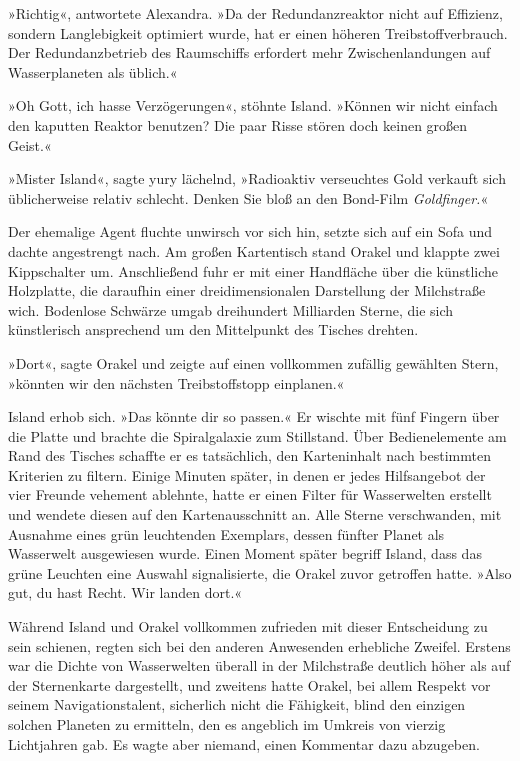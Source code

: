 »Richtig«, antwortete Alexandra. »Da der Redundanzreaktor nicht auf Effizienz, sondern Langlebigkeit optimiert wurde, hat er einen höheren Treibstoffverbrauch. Der Redundanzbetrieb des Raumschiffs erfordert mehr Zwischenlandungen auf Wasserplaneten als üblich.«

»Oh Gott, ich hasse Verzögerungen«, stöhnte Island. »Können wir nicht einfach den kaputten Reaktor benutzen? Die paar Risse stören doch keinen großen Geist.«

»Mister Island«, sagte yury lächelnd, »Radioaktiv verseuchtes Gold verkauft sich üblicherweise relativ schlecht. Denken Sie bloß an den Bond-Film \textit{Goldfinger.}«

Der ehemalige Agent fluchte unwirsch vor sich hin, setzte sich auf ein Sofa und dachte angestrengt nach. Am großen Kartentisch stand Orakel und klappte zwei Kippschalter um. Anschließend fuhr er mit einer Handfläche über die künstliche Holzplatte, die daraufhin einer dreidimensionalen Darstellung der Milchstraße wich. Bodenlose Schwärze umgab dreihundert Milliarden Sterne, die sich künstlerisch ansprechend um den Mittelpunkt des Tisches drehten.

»Dort«, sagte Orakel und zeigte auf einen vollkommen zufällig gewählten Stern, »könnten wir den nächsten Treibstoffstopp einplanen.«

Island erhob sich. »Das könnte dir so passen.« Er wischte mit fünf Fingern über die Platte und brachte die Spiralgalaxie zum Stillstand. Über Bedienelemente am Rand des Tisches schaffte er es tatsächlich, den Karteninhalt nach bestimmten Kriterien zu filtern. Einige Minuten später, in denen er jedes Hilfsangebot der vier Freunde vehement ablehnte, hatte er einen Filter für Wasserwelten erstellt und wendete diesen auf den Kartenausschnitt an. Alle Sterne verschwanden, mit Ausnahme eines grün leuchtenden Exemplars, dessen fünfter Planet als Wasserwelt ausgewiesen wurde. Einen Moment später begriff Island, dass das grüne Leuchten eine Auswahl signalisierte, die Orakel zuvor getroffen hatte. »Also gut, du hast Recht. Wir landen dort.«

Während Island und Orakel vollkommen zufrieden mit dieser Entscheidung zu sein schienen, regten sich bei den anderen Anwesenden erhebliche Zweifel. Erstens war die Dichte von Wasserwelten überall in der Milchstraße deutlich höher als auf der Sternenkarte dargestellt, und zweitens hatte Orakel, bei allem Respekt vor seinem Navigationstalent, sicherlich nicht die Fähigkeit, blind den einzigen solchen Planeten zu ermitteln, den es angeblich im Umkreis von vierzig Lichtjahren gab. Es wagte aber niemand, einen Kommentar dazu abzugeben.

